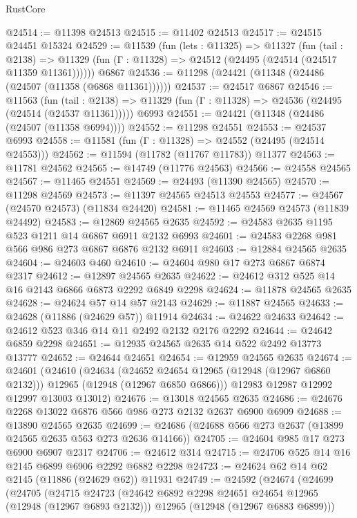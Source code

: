 \begin{lexlean}{RustCore}
\begin{coremodule}
@24514 := @11398 @24513
@24515 := @11402 @24513
@24517 := @24515 @24451 @15324
@24529 := @11539
    (fun (lets : @11325) =>
    @11327
      (fun (tail : @2138) =>
      @11329 (fun (Γ : @11328) => @24512 (@24495 (@24514 (@24517 @11359 @11361))))))
    @6867
@24536 := @11298 (@24421 (@11348 (@24486 (@24507 (@11358 (@6868 @11361))))))
@24537 := @24517 @6867
@24546 := @11563
    (fun (tail : @2138) => @11329 (fun (Γ : @11328) => @24536 (@24495 (@24514 (@24537 @11361)))))
    @6993
@24551 := @24421 (@11348 (@24486 (@24507 (@11358 @6994))))
@24552 := @11298 @24551
@24553 := @24537 @6993
@24558 := @11581 (fun (Γ : @11328) => @24552 (@24495 (@24514 @24553)))
@24562 := @11594 (@11782 (@11767 @11783)) @11377
@24563 := @11781 @24562
@24565 := @14749 (@11776 @24563)
@24566 := @24558 @24565
@24567 := @11465 @24551
@24569 := @24493 (@11390 @24565)
@24570 := @11298 @24569
@24573 := @11397 @24565 @24513 @24553
@24577 := @24567 (@24570 @24573) (@11834 @24420)
@24581 := @11465 @24569 @24573 (@11839 @24492)
@24583 := @12869 @24565 @2635
@24592 := @24583 @2635 @1195 @523 @1211 @14 @6867 @6911 @2132 @6993
@24601 := @24583 @2268 @981 @566 @986 @273 @6867 @6876 @2132 @6911
@24603 := @12884 @24565 @2635
@24604 := @24603 @460
@24610 := @24604 @980 @17 @273 @6867 @6874 @2317
@24612 := @12897 @24565 @2635
@24622 := @24612 @312 @525 @14 @16 @2143 @6866 @6873 @2292 @6849 @2298
@24624 := @11878 @24565 @2635
@24628 := @24624 @57 @14 @57 @2143
@24629 := @11887 @24565
@24633 := @24628 (@11886 (@24629 @57)) @11914
@24634 := @24622 @24633
@24642 := @24612 @523 @346 @14 @11 @2492 @2132 @2176 @2292
@24644 := @24642 @6859 @2298
@24651 := @12935 @24565 @2635 @14 @522 @2492 @13773 @13777
@24652 := @24644 @24651
@24654 := @12959 @24565 @2635
@24674 := @24601
    (@24610
      (@24634
        (@24652 @24654 @12965 (@12948 (@12967 @6860 @2132)))
        @12965
        (@12948 (@12967 @6850 @6866)))
      @12983
      @12987
      @12992
      @12997
      @13003
      @13012)
@24676 := @13018 @24565 @2635
@24686 := @24676 @2268 @13022 @6876 @566 @986 @273 @2132 @2637 @6900 @6909
@24688 := @13890 @24565 @2635
@24699 := @24686 (@24688 @566 @273 @2637 (@13899 @24565 @2635 @563 @273 @2636 @14166))
@24705 := @24604 @985 @17 @273 @6900 @6907 @2317
@24706 := @24612 @314
@24715 := @24706 @525 @14 @16 @2145 @6899 @6906 @2292 @6882 @2298
@24723 := @24624 @62 @14 @62 @2145 (@11886 (@24629 @62)) @11931
@24749 := @24592
    (@24674
      (@24699
        (@24705
          (@24715
            @24723
            (@24642 @6892 @2298 @24651 @24654 @12965 (@12948 (@12967 @6893 @2132)))
            @12965
            (@12948 (@12967 @6883 @6899)))

\end{coremodule}
\end{lexlean}

